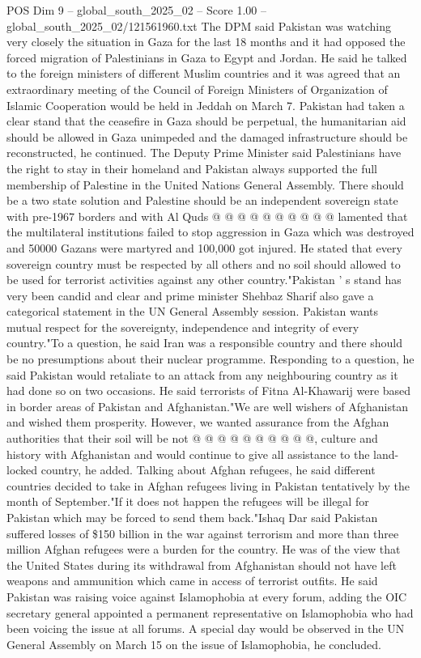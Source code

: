 \begin{textsample}{POS Dim 9 – global\_south\_2025\_02 – Score 1.00 – global\_south\_2025\_02/121561960.txt}
The DPM said Pakistan was watching very closely the situation in Gaza for the last 18 months and it had opposed the forced migration of Palestinians in Gaza to Egypt and Jordan.
He said he talked to the foreign ministers of different Muslim countries and it was agreed that an extraordinary meeting of the Council of Foreign Ministers of Organization of Islamic Cooperation would be held in Jeddah on March 7.
Pakistan had taken a clear stand that the ceasefire in Gaza should be perpetual, the humanitarian aid should be allowed in Gaza unimpeded and the damaged infrastructure should be reconstructed, he continued.
The Deputy Prime Minister said Palestinians have the right to stay in their homeland and Pakistan always supported the full membership of Palestine in the United Nations General Assembly.
There should be a two state solution and Palestine should be an independent sovereign state with pre-1967 borders and with Al Quds @ @ @ @ @ @ @ @ @ @ lamented that the multilateral institutions failed to stop aggression in Gaza which was destroyed and 50000 Gazans were martyred and 100,000 got injured.
He stated that every sovereign country must be respected by all others and no soil should allowed to be used for terrorist activities against any other country."Pakistan ' s stand has very been candid and clear and prime minister Shehbaz Sharif also gave a categorical statement in the UN General Assembly session.
Pakistan wants mutual respect for the sovereignty, independence and integrity of every country."To a question, he said Iran was a responsible country and there should be no presumptions about their nuclear programme.
Responding to a question, he said Pakistan would retaliate to an attack from any neighbouring country as it had done so on two occasions.
He said terrorists of Fitna Al-Khawarij were based in border areas of Pakistan and Afghanistan."We are well wishers of Afghanistan and wished them prosperity.
However, we wanted assurance from the Afghan authorities that their soil will be not @ @ @ @ @ @ @ @ @ @, culture and history with Afghanistan and would continue to give all assistance to the land-locked country, he added.
Talking about Afghan refugees, he said different countries decided to take in Afghan refugees living in Pakistan tentatively by the month of September."If it does not happen the refugees will be illegal for Pakistan which may be forced to send them back."Ishaq Dar said Pakistan suffered losses of \$150 billion in the war against terrorism and more than three million Afghan refugees were a burden for the country.
He was of the view that the United States during its withdrawal from Afghanistan should not have left weapons and ammunition which came in access of terrorist outfits.
He said Pakistan was raising voice against Islamophobia at every forum, adding the OIC secretary general appointed a permanent representative on Islamophobia who had been voicing the issue at all forums.
A special day would be observed in the UN General Assembly on March 15 on the issue of Islamophobia, he concluded.

\end{textsample}
